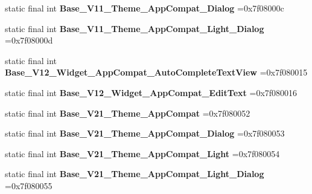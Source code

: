 \begin{DoxyCompactItemize}
\item 
\hypertarget{classcheck_1_1test_1_1_r_1_1style_aa91389e1487fad366abefc7bfb8025b0}{}static final int {\bfseries Base\+\_\+\+V11\+\_\+\+Theme\+\_\+\+App\+Compat\+\_\+\+Dialog} =0x7f08000c\label{classcheck_1_1test_1_1_r_1_1style_aa91389e1487fad366abefc7bfb8025b0}

\item 
\hypertarget{classcheck_1_1test_1_1_r_1_1style_ad156354fe07ca3abd456fee7b790ab0a}{}static final int {\bfseries Base\+\_\+\+V11\+\_\+\+Theme\+\_\+\+App\+Compat\+\_\+\+Light\+\_\+\+Dialog} =0x7f08000d\label{classcheck_1_1test_1_1_r_1_1style_ad156354fe07ca3abd456fee7b790ab0a}

\item 
\hypertarget{classcheck_1_1test_1_1_r_1_1style_a9bb6f79d791e4625fc28d15cf106be35}{}static final int {\bfseries Base\+\_\+\+V12\+\_\+\+Widget\+\_\+\+App\+Compat\+\_\+\+Auto\+Complete\+Text\+View} =0x7f080015\label{classcheck_1_1test_1_1_r_1_1style_a9bb6f79d791e4625fc28d15cf106be35}

\item 
\hypertarget{classcheck_1_1test_1_1_r_1_1style_ab99080d95fbaceb6626a72e391ba962f}{}static final int {\bfseries Base\+\_\+\+V12\+\_\+\+Widget\+\_\+\+App\+Compat\+\_\+\+Edit\+Text} =0x7f080016\label{classcheck_1_1test_1_1_r_1_1style_ab99080d95fbaceb6626a72e391ba962f}

\item 
\hypertarget{classcheck_1_1test_1_1_r_1_1style_a846b4f2fc3f263129e7b4d4bff6bb6bf}{}static final int {\bfseries Base\+\_\+\+V21\+\_\+\+Theme\+\_\+\+App\+Compat} =0x7f080052\label{classcheck_1_1test_1_1_r_1_1style_a846b4f2fc3f263129e7b4d4bff6bb6bf}

\item 
\hypertarget{classcheck_1_1test_1_1_r_1_1style_ad0bea92c9e42c30f5ea7c65a3e5b2369}{}static final int {\bfseries Base\+\_\+\+V21\+\_\+\+Theme\+\_\+\+App\+Compat\+\_\+\+Dialog} =0x7f080053\label{classcheck_1_1test_1_1_r_1_1style_ad0bea92c9e42c30f5ea7c65a3e5b2369}

\item 
\hypertarget{classcheck_1_1test_1_1_r_1_1style_ad6c28828b2c3618204209318bfa75626}{}static final int {\bfseries Base\+\_\+\+V21\+\_\+\+Theme\+\_\+\+App\+Compat\+\_\+\+Light} =0x7f080054\label{classcheck_1_1test_1_1_r_1_1style_ad6c28828b2c3618204209318bfa75626}

\item 
\hypertarget{classcheck_1_1test_1_1_r_1_1style_a25a161e86c37b2510c037d89c0eedc66}{}static final int {\bfseries Base\+\_\+\+V21\+\_\+\+Theme\+\_\+\+App\+Compat\+\_\+\+Light\+\_\+\+Dialog} =0x7f080055\label{classcheck_1_1test_1_1_r_1_1style_a25a161e86c37b2510c037d89c0eedc66}


\end{DoxyCompactItemize}
